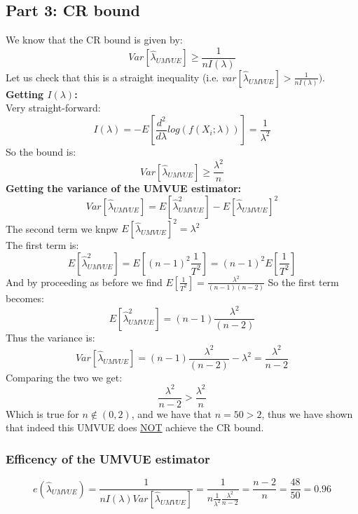 \documentclass[12pt]{article}
\begin{document}
\subsection*{Part 3: CR bound}
We know that the CR bound is given by:
\[
Var[\hat{\lambda}_{UMVUE}] \geq \frac{1}{nI(\lambda)}
\]
Let us check that this is a straight inequality (i.e. $ var[\hat{\lambda}_{UMVUE}] > \frac{1}{nI(\lambda)})$. 
\textbf{Getting $I(\lambda)$:}\\
Very straight-forward: 
\[
I(\lambda) = -E[\frac{d^2}{d\lambda}log(f(X_i;\lambda))] = \frac{1}{\lambda^2}
\]
So the bound is: 
\[
Var[\hat{\lambda}_{UMVUE}] \geq \frac{\lambda^2}{n}
\]
\textbf{Getting the variance of the UMVUE estimator:}\\
\[
Var[\hat{\lambda}_{UMVUE}] = E[\hat{\lambda}_{UMVUE}^2] - E[\hat{\lambda}_{UMVUE}]^2
\]
The second term we knpw $E[\hat{\lambda}_{UMVUE}]^2= \lambda^2$\\
The first term is:
\[
E[\hat{\lambda}_{UMVUE}^2] = E[(n-1)^2\frac{1}{T^2}] = (n-1)^2E[\frac{1}{T^2}]
\]
And by proceeding as before we find $E[\frac{1}{T^2}] = \frac{\lambda^2}{(n-1)(n-2)}$
So the first term becomes: 
\[
E[\hat{\lambda}_{UMVUE}^2] = (n-1)\frac{\lambda^2}{(n-2)}
\]
Thus the variance is: 
\[
Var[\hat{\lambda}_{UMVUE}] = (n-1)\frac{\lambda^2}{(n-2)} - \lambda^2 = \frac{\lambda^2}{n-2}
\]
Comparing the two we get:
\[
\frac{\lambda^2}{n-2} > \frac{\lambda^2}{n}
\] 
Which is true for $n \notin (0,2)$, and we have that $n=50>2$, thus we have shown that indeed this UMVUE does \underline{NOT} achieve the CR bound. 
\subsubsection*{Efficency of the UMVUE estimator}
\[
e(\hat{\lambda}_{UMVUE}) = \frac{1}{nI(\lambda)Var[\hat{\lambda}_{UMVUE}]} = \frac{1}{n\frac{1}{\lambda^2}\frac{\lambda^2}{n-2}} = \frac{n-2}{n} = \frac{48}{50} = 0.96
\]
\end{document}
